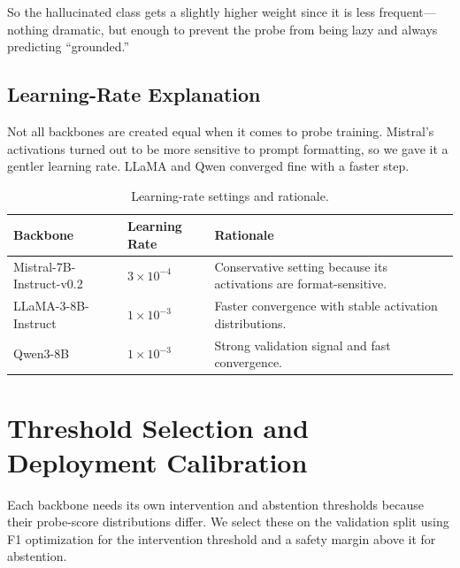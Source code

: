 \noindent So the hallucinated class gets a slightly higher weight since it is less frequent—nothing dramatic, but enough to prevent the probe from being lazy and always predicting ``grounded.''
\newpage
\subsection{Learning-Rate Explanation}
\label{sec:lr_explanation}

Not all backbones are created equal when it comes to probe training. Mistral's activations turned out to be more sensitive to prompt formatting, so we gave it a gentler learning rate. LLaMA and Qwen converged fine with a faster step.

\begin{table}[!htb]
\centering
\caption{Learning-rate settings and rationale.}
\label{tab:lr_settings}
\footnotesize
\renewcommand{\arraystretch}{1.25}
\setlength{\tabcolsep}{4pt}

\begin{tabularx}{\textwidth}{@{}p{3.6cm} p{2.2cm} X@{}}
\toprule
\textbf{Backbone} & \textbf{Learning Rate} & \textbf{Rationale} \\
\midrule

Mistral-7B-Instruct-v0.2 
& $3 \times 10^{-4}$ 
& Conservative setting because its activations are format-sensitive. \\

LLaMA-3-8B-Instruct 
& $1 \times 10^{-3}$ 
& Faster convergence with stable activation distributions. \\

Qwen3-8B 
& $1 \times 10^{-3}$ 
& Strong validation signal and fast convergence. \\

\bottomrule
\end{tabularx}
\end{table}

\section{Threshold Selection and Deployment Calibration}
\label{sec:threshold_selection}

Each backbone needs its own intervention and abstention thresholds because their probe-score distributions differ. We select these on the validation split using F1 optimization for the intervention threshold and a safety margin above it for abstention.


